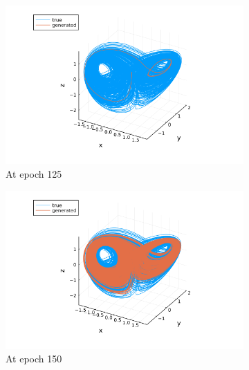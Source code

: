 

\begin{figure}
    \centering
    \begin{subfigure}[b]{0.24\textwidth}
        \centering
        \includegraphics[width=\linewidth]{Images/training_epochs/traj_gen_3d_125.png}
        \caption{At epoch 125}
        \label{fig:traj_gen_3d_125}
    \end{subfigure}%
    \begin{subfigure}[b]{0.24\textwidth}
        \centering
        \includegraphics[width=\linewidth]{Images/training_epochs/traj_gen_3d_150.png}
        \caption{At epoch 150}
        \label{fig:traj_gen_3d_150}
    \end{subfigure}%
    \begin{subfigure}[b]{0.24\textwidth}

\end{subfigure}
\end{figure}
